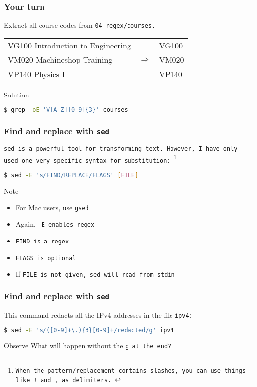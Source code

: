 \begin{frame}[fragile]
\frametitle{Your turn}
Extract all course codes from \tt{04-regex/courses}. \newline

\begin{example}
    \begin{tabular}{lcl}
        VG100 Introduction to Engineering & & VG100 \\
        VM020 Machineshop Training & $\Longrightarrow$ & VM020 \\
        VP140 Physics I & & VP140
    \end{tabular}
\end{example}
\pause
\begin{block}{Solution}
\begin{lstlisting}[language=bash]
$ grep -oE 'V[A-Z][0-9]{3}' courses
\end{lstlisting}
\end{block}
\end{frame}

\begin{frame}[fragile]
\frametitle{Find and replace with \tt{sed}}
\tt{sed} is a powerful tool for transforming text. However, I have only
used one very specific syntax for substitution:
\footnote{
    When the pattern/replacement contains slashes, you can use things like
    \tt{!} and \tt{,} as delimiters.
}
\begin{lstlisting}[language=bash]
$ sed -E 's/FIND/REPLACE/FLAGS' [FILE]
\end{lstlisting}
\begin{block}{Note}
    \begin{itemize}
        \item For Mac users, use \tt{gsed}
        \item Again, \tt{-E} enables regex
        \item \tt{FIND} is a regex
        \item \tt{FLAGS} is optional
        \item If \tt{FILE} is not given, sed will read from stdin
    \end{itemize}
\end{block}
\end{frame}

\begin{frame}[fragile]
\frametitle{Find and replace with \tt{sed}}
This command redacts all the IPv4 addresses in the file \tt{ipv4}:
\begin{lstlisting}[language=bash]
$ sed -E 's/([0-9]+\.){3}[0-9]+/redacted/g' ipv4
\end{lstlisting}
\begin{block}{Observe}
    What will happen without the \tt{g} at the end?
\end{block}
\end{frame}

